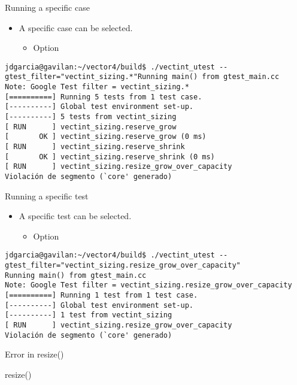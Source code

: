 \begin{frame}[t,fragile]{Running a specific case}
\begin{itemize}
  \item A specific case can be selected.
    \begin{itemize}
      \item Option 
    \end{itemize}
\end{itemize}
\begin{lstlisting}[style=terminal,basicstyle=\tiny\ttfamily]
jdgarcia@gavilan:~/vector4/build$ ./vectint_utest --gtest_filter="vectint_sizing.*"Running main() from gtest_main.cc
Note: Google Test filter = vectint_sizing.*
[==========] Running 5 tests from 1 test case.
[----------] Global test environment set-up.
[----------] 5 tests from vectint_sizing
[ RUN      ] vectint_sizing.reserve_grow
[       OK ] vectint_sizing.reserve_grow (0 ms)
[ RUN      ] vectint_sizing.reserve_shrink
[       OK ] vectint_sizing.reserve_shrink (0 ms)
[ RUN      ] vectint_sizing.resize_grow_over_capacity
Violación de segmento (`core' generado)
\end{lstlisting}
\end{frame}

\begin{frame}[t,fragile]{Running a specific test}
\begin{itemize}
  \item A specific test can be selected.
    \begin{itemize}
      \item Option 
    \end{itemize}
\end{itemize}
\begin{lstlisting}[style=terminal,basicstyle=\tiny\ttfamily]
jdgarcia@gavilan:~/vector4/build$ ./vectint_utest --gtest_filter="vectint_sizing.resize_grow_over_capacity"
Running main() from gtest_main.cc
Note: Google Test filter = vectint_sizing.resize_grow_over_capacity
[==========] Running 1 test from 1 test case.
[----------] Global test environment set-up.
[----------] 1 test from vectint_sizing
[ RUN      ] vectint_sizing.resize_grow_over_capacity
Violación de segmento (`core' generado)
\end{lstlisting}
\end{frame}

\begin{frame}[t]{Error in resize()}
\begin{block}{resize()}

\end{block}
\end{frame}

